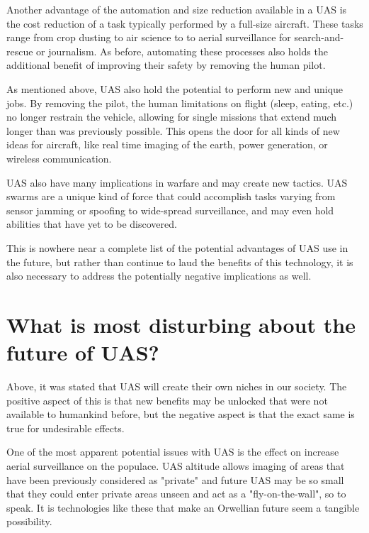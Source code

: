 \documentclass[]{aiaa-tc}%
\begin{document}
Another advantage of the automation and size reduction available in a UAS is the cost reduction of a task typically performed by a full-size aircraft.  These tasks range from crop dusting to air science to to aerial surveillance for search-and-rescue or journalism.  As before, automating these processes also holds the additional benefit of improving their safety by removing the human pilot.

As mentioned above, UAS also hold the potential to perform new and unique jobs.  By removing the pilot, the human limitations on flight (sleep, eating, etc.) no longer restrain the vehicle, allowing for single missions that extend much longer than was previously possible.  This opens the door for all kinds of new ideas for aircraft, like real time imaging of the earth, power generation, or wireless communication.

UAS also have many implications in warfare and may create new tactics.  UAS swarms are a unique kind of force that could accomplish tasks varying from sensor jamming or spoofing to wide-spread surveillance, and may even hold abilities that have yet to be discovered.

This is nowhere near a complete list of the potential advantages of UAS use in the future, but rather than continue to laud the benefits of this technology, it is also necessary to address the potentially negative implications as well.


\section*{What is most disturbing about the future of UAS?}

Above, it was stated that UAS will create their own niches in our society.  The positive aspect of this is that new benefits may be unlocked that were not available to humankind before, but the negative aspect is that the exact same is true for undesirable effects.

One of the most apparent potential issues with UAS is the effect on increase aerial surveillance on the populace.  UAS altitude allows imaging of areas that have been previously considered as "private" and future UAS may be so small that they could enter private areas unseen and act as a "fly-on-the-wall", so to speak.  It is technologies like these that make an Orwellian future seem a tangible possibility.
\end{document}
